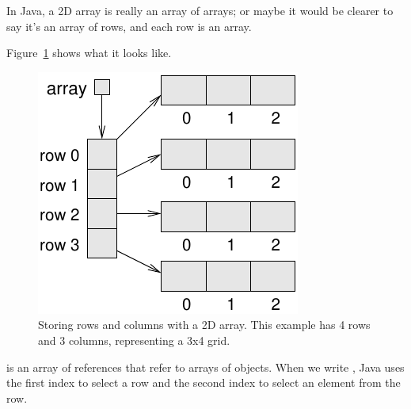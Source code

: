 In Java, a 2D array is really an array of arrays; or maybe it would be clearer to say it's an array of rows, and each row is an array.

%
%
%

Figure~\ref{fig:2D-array} shows what it looks like.

\begin{figure}[!ht]
\begin{center}
\includegraphics{figs/2D-array.pdf}
\caption{Storing rows and columns with a 2D array.
This example has 4 rows and 3 columns, representing a 3x4 grid.}
\label{fig:2D-array}
\end{center}
\end{figure}

 is an array of references that refer to arrays of  objects.
When we write , Java uses the first index to select a row and the second index to select an element from the row.

